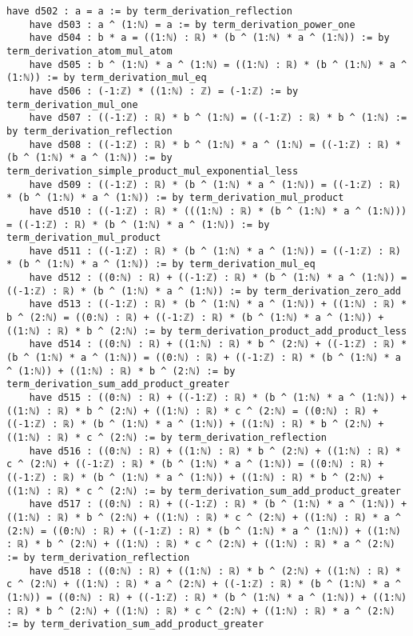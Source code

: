 \documentclass{article}
\begin{document}
\begin{tcolorbox}[colback=white!10, width=\linewidth]
\begin{lstlisting}[language=Lean4]
    have d502 : a = a := by term_derivation_reflection
    have d503 : a ^ (1:ℕ) = a := by term_derivation_power_one
    have d504 : b * a = ((1:ℕ) : ℝ) * (b ^ (1:ℕ) * a ^ (1:ℕ)) := by term_derivation_atom_mul_atom
    have d505 : b ^ (1:ℕ) * a ^ (1:ℕ) = ((1:ℕ) : ℝ) * (b ^ (1:ℕ) * a ^ (1:ℕ)) := by term_derivation_mul_eq
    have d506 : (-1:ℤ) * ((1:ℕ) : ℤ) = (-1:ℤ) := by term_derivation_mul_one
    have d507 : ((-1:ℤ) : ℝ) * b ^ (1:ℕ) = ((-1:ℤ) : ℝ) * b ^ (1:ℕ) := by term_derivation_reflection
    have d508 : ((-1:ℤ) : ℝ) * b ^ (1:ℕ) * a ^ (1:ℕ) = ((-1:ℤ) : ℝ) * (b ^ (1:ℕ) * a ^ (1:ℕ)) := by term_derivation_simple_product_mul_exponential_less
    have d509 : ((-1:ℤ) : ℝ) * (b ^ (1:ℕ) * a ^ (1:ℕ)) = ((-1:ℤ) : ℝ) * (b ^ (1:ℕ) * a ^ (1:ℕ)) := by term_derivation_mul_product
    have d510 : ((-1:ℤ) : ℝ) * (((1:ℕ) : ℝ) * (b ^ (1:ℕ) * a ^ (1:ℕ))) = ((-1:ℤ) : ℝ) * (b ^ (1:ℕ) * a ^ (1:ℕ)) := by term_derivation_mul_product
    have d511 : ((-1:ℤ) : ℝ) * (b ^ (1:ℕ) * a ^ (1:ℕ)) = ((-1:ℤ) : ℝ) * (b ^ (1:ℕ) * a ^ (1:ℕ)) := by term_derivation_mul_eq
    have d512 : ((0:ℕ) : ℝ) + ((-1:ℤ) : ℝ) * (b ^ (1:ℕ) * a ^ (1:ℕ)) = ((-1:ℤ) : ℝ) * (b ^ (1:ℕ) * a ^ (1:ℕ)) := by term_derivation_zero_add
    have d513 : ((-1:ℤ) : ℝ) * (b ^ (1:ℕ) * a ^ (1:ℕ)) + ((1:ℕ) : ℝ) * b ^ (2:ℕ) = ((0:ℕ) : ℝ) + ((-1:ℤ) : ℝ) * (b ^ (1:ℕ) * a ^ (1:ℕ)) + ((1:ℕ) : ℝ) * b ^ (2:ℕ) := by term_derivation_product_add_product_less
    have d514 : ((0:ℕ) : ℝ) + ((1:ℕ) : ℝ) * b ^ (2:ℕ) + ((-1:ℤ) : ℝ) * (b ^ (1:ℕ) * a ^ (1:ℕ)) = ((0:ℕ) : ℝ) + ((-1:ℤ) : ℝ) * (b ^ (1:ℕ) * a ^ (1:ℕ)) + ((1:ℕ) : ℝ) * b ^ (2:ℕ) := by term_derivation_sum_add_product_greater
    have d515 : ((0:ℕ) : ℝ) + ((-1:ℤ) : ℝ) * (b ^ (1:ℕ) * a ^ (1:ℕ)) + ((1:ℕ) : ℝ) * b ^ (2:ℕ) + ((1:ℕ) : ℝ) * c ^ (2:ℕ) = ((0:ℕ) : ℝ) + ((-1:ℤ) : ℝ) * (b ^ (1:ℕ) * a ^ (1:ℕ)) + ((1:ℕ) : ℝ) * b ^ (2:ℕ) + ((1:ℕ) : ℝ) * c ^ (2:ℕ) := by term_derivation_reflection
    have d516 : ((0:ℕ) : ℝ) + ((1:ℕ) : ℝ) * b ^ (2:ℕ) + ((1:ℕ) : ℝ) * c ^ (2:ℕ) + ((-1:ℤ) : ℝ) * (b ^ (1:ℕ) * a ^ (1:ℕ)) = ((0:ℕ) : ℝ) + ((-1:ℤ) : ℝ) * (b ^ (1:ℕ) * a ^ (1:ℕ)) + ((1:ℕ) : ℝ) * b ^ (2:ℕ) + ((1:ℕ) : ℝ) * c ^ (2:ℕ) := by term_derivation_sum_add_product_greater
    have d517 : ((0:ℕ) : ℝ) + ((-1:ℤ) : ℝ) * (b ^ (1:ℕ) * a ^ (1:ℕ)) + ((1:ℕ) : ℝ) * b ^ (2:ℕ) + ((1:ℕ) : ℝ) * c ^ (2:ℕ) + ((1:ℕ) : ℝ) * a ^ (2:ℕ) = ((0:ℕ) : ℝ) + ((-1:ℤ) : ℝ) * (b ^ (1:ℕ) * a ^ (1:ℕ)) + ((1:ℕ) : ℝ) * b ^ (2:ℕ) + ((1:ℕ) : ℝ) * c ^ (2:ℕ) + ((1:ℕ) : ℝ) * a ^ (2:ℕ) := by term_derivation_reflection
    have d518 : ((0:ℕ) : ℝ) + ((1:ℕ) : ℝ) * b ^ (2:ℕ) + ((1:ℕ) : ℝ) * c ^ (2:ℕ) + ((1:ℕ) : ℝ) * a ^ (2:ℕ) + ((-1:ℤ) : ℝ) * (b ^ (1:ℕ) * a ^ (1:ℕ)) = ((0:ℕ) : ℝ) + ((-1:ℤ) : ℝ) * (b ^ (1:ℕ) * a ^ (1:ℕ)) + ((1:ℕ) : ℝ) * b ^ (2:ℕ) + ((1:ℕ) : ℝ) * c ^ (2:ℕ) + ((1:ℕ) : ℝ) * a ^ (2:ℕ) := by term_derivation_sum_add_product_greater

\end{lstlisting}
\end{tcolorbox}
\end{document}
